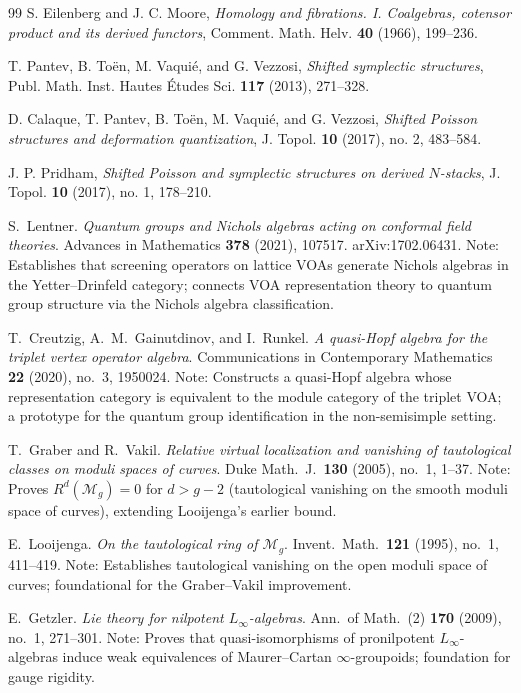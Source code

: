 \begin{thebibliography}{99}
 S. Eilenberg and J. C. Moore, \emph{Homology and fibrations. I. Coalgebras, cotensor product and its derived functors}, Comment. Math. Helv. \textbf{40} (1966), 199--236.

 T. Pantev, B. To\"en, M. Vaqui\'e, and G. Vezzosi, \emph{Shifted symplectic structures}, Publ. Math. Inst. Hautes \'Etudes Sci. \textbf{117} (2013), 271--328.

 D. Calaque, T. Pantev, B. To\"en, M. Vaqui\'e, and G. Vezzosi, \emph{Shifted Poisson structures and deformation quantization}, J. Topol. \textbf{10} (2017), no. 2, 483--584.

 J. P. Pridham, \emph{Shifted Poisson and symplectic structures on derived $N$-stacks}, J. Topol. \textbf{10} (2017), no. 1, 178--210.


S.~Lentner.
\textit{Quantum groups and Nichols algebras acting on conformal
field theories}.
Advances in Mathematics \textbf{378} (2021), 107517.
arXiv:1702.06431.
Note: Establishes that screening operators on lattice VOAs
generate Nichols algebras in the Yetter--Drinfeld category;
connects VOA representation theory to quantum group structure
via the Nichols algebra classification.

T.~Creutzig, A.~M.~Gainutdinov, and I.~Runkel.
\textit{A quasi-Hopf algebra for the triplet vertex operator algebra}.
Communications in Contemporary Mathematics \textbf{22} (2020),
no.~3, 1950024.
Note: Constructs a quasi-Hopf algebra whose representation
category is equivalent to the module category of the triplet
VOA; a prototype for the quantum group identification in the
non-semisimple setting.

T.~Graber and R.~Vakil.
\textit{Relative virtual localization and vanishing of tautological
classes on moduli spaces of curves}.
Duke Math.\ J.\ \textbf{130} (2005), no.~1, 1--37.
Note: Proves $R^d(\mathcal{M}_g) = 0$ for $d > g - 2$
(tautological vanishing on the smooth moduli space of curves),
extending Looijenga's earlier bound.

E.~Looijenga.
\textit{On the tautological ring of $\mathcal{M}_g$}.
Invent.\ Math.\ \textbf{121} (1995), no.~1, 411--419.
Note: Establishes tautological vanishing on the open moduli
space of curves; foundational for the Graber--Vakil improvement.

E.~Getzler.
\textit{Lie theory for nilpotent $L_\infty$-algebras}.
Ann.\ of Math.\ (2) \textbf{170} (2009), no.~1, 271--301.
Note: Proves that quasi-isomorphisms of pronilpotent
$L_\infty$-algebras induce weak equivalences of
Maurer--Cartan $\infty$-groupoids; foundation for gauge rigidity.


\end{thebibliography}

